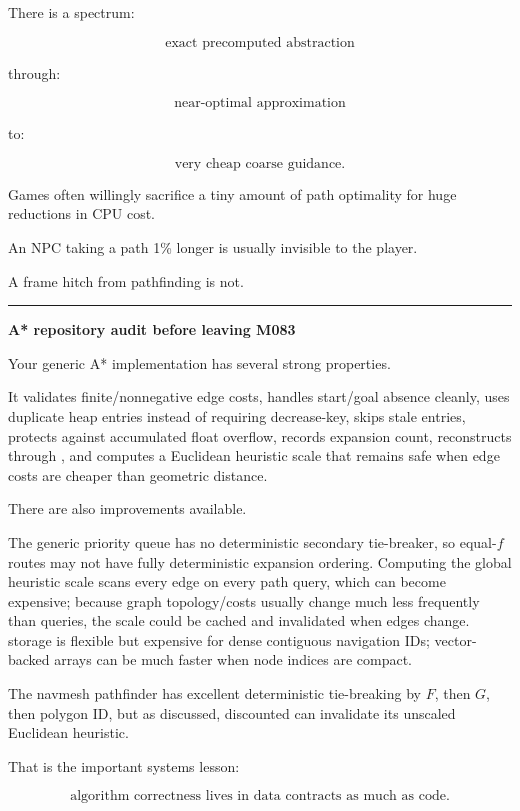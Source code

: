 There is a spectrum:

\[
\text{exact precomputed abstraction}
\]

through:

\[
\text{near-optimal approximation}
\]

to:

\[
\text{very cheap coarse guidance}.
\]

Games often willingly sacrifice a tiny amount of path optimality for huge reductions in CPU cost.

An NPC taking a path 1\% longer is usually invisible to the player.

A frame hitch from pathfinding is not.

\begin{center}\rule{0.5\linewidth}{0.5pt}\end{center}

\textbf{A* repository audit before leaving M083}

Your generic A* implementation has several strong properties.

It validates finite/nonnegative edge costs, handles start/goal absence cleanly, uses duplicate heap entries instead of requiring decrease-key, skips stale entries, protects against accumulated float overflow, records expansion count, reconstructs through , and computes a Euclidean heuristic scale that remains safe when edge costs are cheaper than geometric distance.

There are also improvements available.

The generic priority queue has no deterministic secondary tie-breaker, so equal-\(f\) routes may not have fully deterministic expansion ordering. Computing the global heuristic scale scans every edge on every path query, which can become expensive; because graph topology/costs usually change much less frequently than queries, the scale could be cached and invalidated when edges change.  storage is flexible but expensive for dense contiguous navigation IDs; vector-backed arrays can be much faster when node indices are compact.

The navmesh pathfinder has excellent deterministic tie-breaking by \(F\), then \(G\), then polygon ID, but as discussed, discounted  can invalidate its unscaled Euclidean heuristic.

That is the important systems lesson:

\[
\boxed{
\text{algorithm correctness lives in data contracts as much as code}.
}
\]

